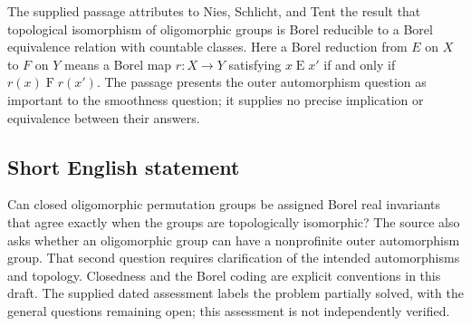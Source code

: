 \documentclass[11pt]{article}
\begin{document}
The supplied passage attributes to Nies, Schlicht, and Tent the result that topological isomorphism of oligomorphic groups is Borel reducible to a Borel equivalence relation with countable classes. Here a Borel reduction from \(E\) on \(X\) to \(F\) on \(Y\) means a Borel map \(r:X\to Y\) satisfying \(x\mathrel E x'\) if and only if \(r(x)\mathrel F r(x')\). The passage presents the outer automorphism question as important to the smoothness question; it supplies no precise implication or equivalence between their answers.
\subsection{Short English statement}
Can closed oligomorphic permutation groups be assigned Borel real invariants that agree exactly when the groups are topologically isomorphic? The source also asks whether an oligomorphic group can have a nonprofinite outer automorphism group. That second question requires clarification of the intended automorphisms and topology. Closedness and the Borel coding are explicit conventions in this draft. The supplied dated assessment labels the problem partially solved, with the general questions remaining open; this assessment is not independently verified.
\end{document}
